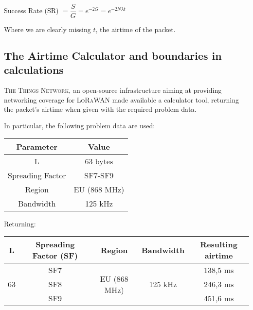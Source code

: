 \documentclass[a4paper,11pt]{article} %
\begin{document}
    \bigskip

    Success Rate (SR) $= \dfrac{S}{G} = e^{-2G} = e^{-2N\lambda t}$

    \bigskip

    Where we are clearly missing $t$, the airtime of the packet.

    \subsection{The Airtime Calculator and boundaries in calculations}\label{subsec:the-airtime-calculator-and-boundaries-in-calculations}

    \textsc{The Things Network}, an open-source infrastructure aiming at providing networking coverage for \textsc{LoRaWAN} made available a calculator tool, returning the packet's airtime when given with the required problem data.

    \smallskip

    In particular, the following problem data are used:

    \medskip

    \begin{tabular}{|c|c|}
        \hline
        Parameter        & Value        \\
        \hline
        L                & 63 bytes     \\
        \hline
        Spreading Factor & SF7-SF9      \\
        \hline
        Region           & EU (868 MHz) \\
        \hline
        Bandwidth        & 125 kHz      \\
        \hline
    \end{tabular}

    \bigskip

    Returning:

    \medskip

    \begin{tabular}{|c|c|c|c|c|}
        \hline
        L                   & Spreading Factor (SF) & Region                        & Bandwidth                & Resulting airtime \\
        \hline
        \multirow{3}{*}{63} & SF7                   & \multirow{3}{*}{EU (868 MHz)} & \multirow{3}{*}{125 kHz} & 138,5 ms          \\
        \cline{2-2} \cline{5-5}
        & SF8                   &                               &                          & 246,3 ms          \\
        \cline{2-2} \cline{5-5}
        & SF9                   &                               &                          & 451,6 ms          \\
        \hline
    \end{tabular}
\end{document}
